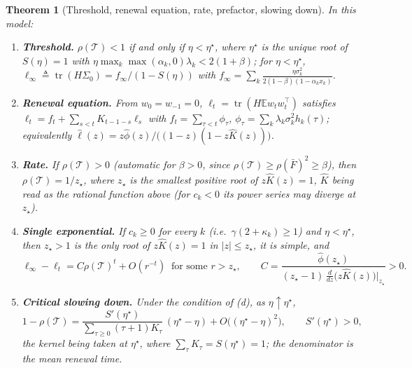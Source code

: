 \documentclass[11pt]{article}
\newtheorem{theorem}{Theorem}
\theoremstyle{remark}
\newcommand{\E}{\mathbb{E}}
\newcommand{\tr}{\operatorname{tr}}
\newcommand{\T}{\mathcal T}
\begin{document}
\begin{theorem}[Threshold, renewal equation, rate, prefactor, slowing down]\label{thm:main}
In this model:
\begin{enumerate}
\item[(a)] \textbf{Threshold.} $\rho(\T)<1$ if and only if $\eta<\eta^\star$, where $\eta^\star$ is the unique root of $S(\eta)=1$ with $\eta\max_k\max(\alpha_k,0)\lambda_k<2(1+\beta)$; for $\eta<\eta^\star$, $\ell_\infty\triangleq\tr(H\Sigma_0)=f_\infty/(1-S(\eta))$ with $f_\infty=\sum_k\frac{\eta\sigma_k^2}{2(1-\beta)(1-\alpha_kx_k)}$.
\item[(b)] \textbf{Renewal equation.} From $w_0=w_{-1}=0$, $\ell_t=\tr(H\E w_tw_t^\top)$ satisfies $\ell_t=f_t+\sum_{s<t}K_{t-1-s}\ell_s$ with $f_t=\sum_{\tau<t}\phi_\tau$, $\phi_\tau=\sum_k\lambda_k\sigma_k^2h_k(\tau)$; equivalently $\widehat\ell(z)=z\widehat\phi(z)/\big((1-z)(1-z\widehat K(z))\big)$.
\item[(c)] \textbf{Rate.} If $\rho(\T)>0$ (automatic for $\beta>0$, since $\rho(\T)\ge\rho(\bar F)^2\ge\beta$), then $\rho(\T)=1/z_\star$, where $z_\star$ is the smallest positive root of $z\widehat K(z)=1$, $\widehat K$ being read as the rational function above (for $c_k<0$ its power series may diverge at $z_\star$).
\item[(d)] \textbf{Single exponential.} If $c_k\ge0$ for every $k$ (i.e.\ $\gamma(2+\kappa_k)\ge1$) and $\eta<\eta^\star$, then $z_\star>1$ is the only root of $z\widehat K(z)=1$ in $|z|\le z_\star$, it is simple, and
\[
\ell_\infty-\ell_t=C\rho(\T)^t+O(r^{-t})\ \text{ for some } r>z_\star,\qquad C=\frac{\widehat\phi(z_\star)}{(z_\star-1)\,\frac{d}{dz}\big(z\widehat K(z)\big)\big|_{z_\star}}>0 .
\]
\item[(e)] \textbf{Critical slowing down.} Under the condition of (d), as $\eta\uparrow\eta^\star$,
\[
1-\rho(\T)=\frac{S'(\eta^\star)}{\sum_{\tau\ge0}(\tau+1)K_\tau}\,(\eta^\star-\eta)+O\big((\eta^\star-\eta)^2\big),\qquad S'(\eta^\star)>0,
\]
the kernel being taken at $\eta^\star$, where $\sum_\tau K_\tau=S(\eta^\star)=1$; the denominator is the mean renewal time.
\end{enumerate}
\end{theorem}
\end{document}
